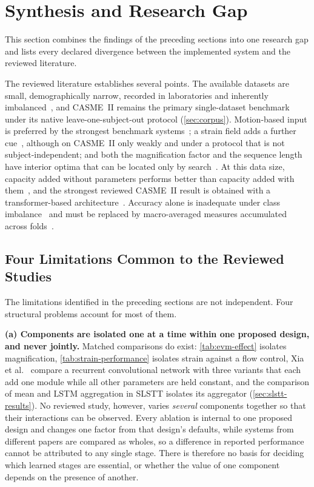 \section{Synthesis and Research Gap}
\label{sec:synthesis-and-gap}

This section combines the findings of the preceding sections into one research gap and lists every declared divergence between the implemented system and the reviewed literature.

The reviewed literature establishes several points. The available datasets are small, demographically narrow, recorded in laboratories and inherently imbalanced~\cite{yan2014,davison2018,see2019}, and CASME~II remains the primary single-dataset benchmark under its native leave-one-subject-out protocol (\autoref{sec:corpus}). Motion-based input is preferred by the strongest benchmark systems~\cite{see2019,liong2019a,zhaoS2021}; a strain field adds a further cue~\cite{liong2016}, although on CASME~II only weakly and under a protocol that is not subject-independent; and both the magnification factor and the sequence length have interior optima that can be located only by search~\cite{liX2018,ben2021}. At this data size, capacity added without parameters performs better than capacity added with them~\cite{xia2020b}, and the strongest reviewed CASME~II result is obtained with a transformer-based architecture~\cite{zhang2022}. Accuracy alone is inadequate under class imbalance~\cite{liong2016,see2019} and must be replaced by macro-averaged measures accumulated across folds~\cite{see2019}.

\subsection{Four Limitations Common to the Reviewed Studies}
\label{sec:four-limitations}

The limitations identified in the preceding sections are not independent. Four structural problems account for most of them.

\textbf{(a) Components are isolated one at a time within one proposed design, and never jointly.} Matched comparisons do exist: \autoref{tab:evm-effect} isolates magnification, \autoref{tab:strain-performance} isolates strain against a flow control, Xia et al.~\cite{xia2020b} compare a recurrent convolutional network with three variants that each add one module while all other parameters are held constant, and the comparison of mean and LSTM aggregation in SLSTT isolates its aggregator (\autoref{sec:slstt-results}). No reviewed study, however, varies \textit{several} components together so that their interactions can be observed. Every ablation is internal to one proposed design and changes one factor from that design's defaults, while systems from different papers are compared as wholes, so a difference in reported performance cannot be attributed to any single stage. There is therefore no basis for deciding which learned stages are essential, or whether the value of one component depends on the presence of another.


